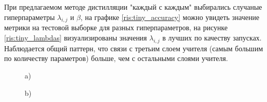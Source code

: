 \documentclass[14]{article}
\begin{document}
При предлагаемом методе дистилляции "каждый с каждым" выбирались случаные гиперпараметры $\lambda_{i, j}$
и $\beta$, на графике \ref{ris:tiny_accuracy} можно увидеть значение метрики на тестовой выборке для разных гиперпараметров,
на рисунке \ref{ris:tiny_lambdas} визуализированы значения $\lambda_{i, j}$ в лучших по качеству запусках.
Наблюдается общий паттерн, что связи с третьим слоем учителя (самым большим по количеству параметров)
больше, чем с остальными слоями учителя.

\begin{figure}
  \begin{minipage}[h]{0.35\linewidth}
     a) \\
  \end{minipage}
  \hfill
  \begin{minipage}[h]{0.35\linewidth}
     b) \\

\end{minipage}
\end{figure}
\end{document}
